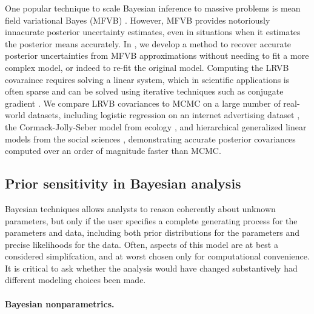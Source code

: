 One popular technique to scale Bayesian inference to massive problems is mean
field variational Bayes (MFVB) \citep{wainwright:2008:graphical,
blei:2017:variational, regier:2019:cataloging}.  However, MFVB provides
notoriously innacurate posterior uncertainty estimates, even in situations when
it estimates the posterior means accurately. In
\citep{giordano:2018:covariances}, we develop a method to recover accurate
posterior uncertainties from MFVB approximations without needing to fit a more
complex model, or indeed to re-fit the original model. Computing the LRVB
covaraince requires solving a linear system, which in scientific applications is
often sparse and can be solved using iterative techniques such as conjugate
gradient \citep[Chapter 5]{nocedal:2006:numerical}.  We compare LRVB covariances
to MCMC on a large number of real-world datasets, including logistic regression
on an internet advertising dataset \citep{criteo:2014:dataset}, the
Cormack-Jolly-Seber model from ecology \citep{kery:2011:bayesian}, and
hierarchical generalized linear models from the social sciences
\citep{gelman:2006:arm}, demonstrating accurate posterior covariances computed
over an order of magnitude faster than MCMC.



\subsection*{Prior sensitivity in Bayesian analysis}

Bayesian techniques allows analysts to reason coherently about unknown
parameters, but only if the user specifies a complete generating process for the
parameters and data, including both prior distributions for the parameters and
precise likelihoods for the data.  Often, aspects of this model are at best a
considered simplifcation, and at worst chosen only for computational
convenience.  It is critical to ask whether the analysis would have changed
substantively had different modeling choices been made.

\paragraph{Bayesian nonparametrics.}

